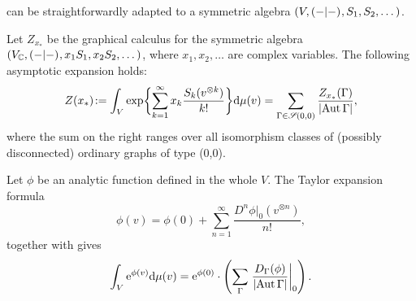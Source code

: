 
 can be straightforwardly adapted to a symmetric
algebra \((V, \inner{-}{-},\break S_1, S_2, \dots)\).
\begin{theorem}\label{thm:FRTsym}
  Let \(Z_{x_*}\) be the graphical calculus for the symmetric algebra
  \((V_{\mathbb{C}}, ( -|- )_{}, x_1S_1, x_2S_2, \dots)\), where
$x_1,x_2,\dots$ are
  complex variables. The following asymptotic expansion holds:
  \begin{equation*}
    Z(x_*)\joinrel:=\int_V \exp \biggl\{ \sum_{k=1}^\infty x_k
    \frac{S_k(v\tp{k})}{k!}
    \biggr\} \ud\mu(v)
    = \sum_{\Gamma\in\SG(0,0)} \frac {Z_{x_*}(\Gamma)} {\card{\Aut\Gamma}},
  \end{equation*}
  where the sum on the right ranges over all isomorphism classes of
(possibly disconnected) ordinary graphs of type (0,0).
\end{theorem}

\begin{example} 
  Let \(\phi\) be an analytic function defined in the whole \(V\). The
  Taylor expansion formula
\begin{equation*}
\phi(v)=\phi(0)+\sum_{n=1}^{\infty}\frac{D^n\phi\vert_0(v^{\otimes
n})}{n!},
\end{equation*}
together with   gives
\begin{equation}
  \int_V \mathrm{e}^{\phi(v)} \mathrm{d}
  \mu(v) = \mathrm{e}^{\phi(0)} \cdot \left(\sum_\Gamma
    \left.\frac{D_\Gamma(\phi)}{\lvert\operatorname{Aut}\Gamma\rvert}\right\vert_0\right).
\end{equation}
\end{example}

